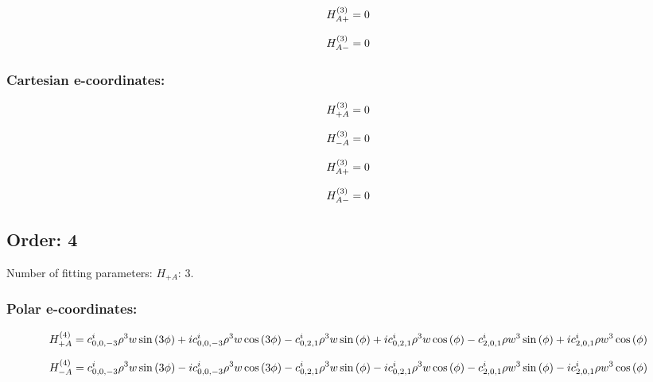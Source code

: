 \documentclass[fleqn]{article}
\begin{document}
\begin{dmath*}
H_{A+}^{(3)}=0\\
\end{dmath*}

\begin{dmath*}
H_{A-}^{(3)}=0\\
\end{dmath*}
\subsubsection*{Cartesian e-coordinates:}

\begin{dmath*}
H_{+A}^{(3)}=0\\
\end{dmath*}

\begin{dmath*}
H_{-A}^{(3)}=0\\
\end{dmath*}

\begin{dmath*}
H_{A+}^{(3)}=0\\
\end{dmath*}

\begin{dmath*}
H_{A-}^{(3)}=0\\
\end{dmath*}
\subsection{Order: 4}
Number of fitting parameters: $H_{+A}$: $3$.
\subsubsection*{Polar e-coordinates:}

\begin{dmath*}
H_{+A}^{(4)}=c^{i}_{0,0,-3} \rho^{3} w \sin{\left (3 \phi \right )} +  i c^{i}_{0,0,-3} \rho^{3} w \cos{\left (3 \phi \right )} - c^{i}_{0,2,1} \rho^{3} w \sin{\left (\phi \right )} +  i c^{i}_{0,2,1} \rho^{3} w \cos{\left (\phi \right )} - c^{i}_{2,0,1} \rho w^{3} \sin{\left (\phi \right )} +  i c^{i}_{2,0,1} \rho w^{3} \cos{\left (\phi \right )}\\
\end{dmath*}

\begin{dmath*}
H_{-A}^{(4)}=c^{i}_{0,0,-3} \rho^{3} w \sin{\left (3 \phi \right )} -  i c^{i}_{0,0,-3} \rho^{3} w \cos{\left (3 \phi \right )} - c^{i}_{0,2,1} \rho^{3} w \sin{\left (\phi \right )} -  i c^{i}_{0,2,1} \rho^{3} w \cos{\left (\phi \right )} - c^{i}_{2,0,1} \rho w^{3} \sin{\left (\phi \right )} -  i c^{i}_{2,0,1} \rho w^{3} \cos{\left (\phi \right )}\\
\end{dmath*}
\end{document}
